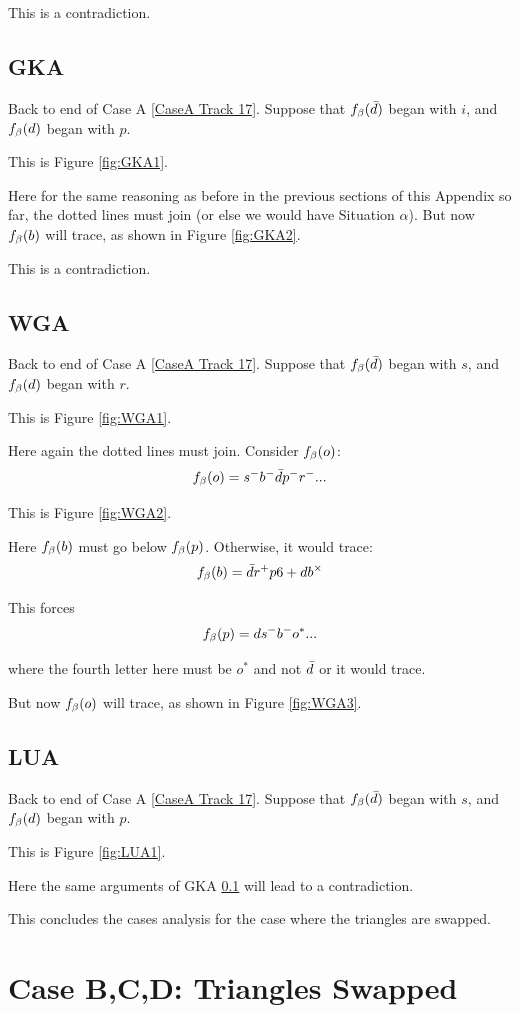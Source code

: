 This is a contradiction.

\subsection{GKA}\label{GKA}
Back to end of Case A \ref{CaseA Track 17}. Suppose that $f_\beta(\bar{d})$ began with $i$, and $f_\beta(d)$ began with $p$.

This is Figure \ref{fig:GKA1}.

Here for the same reasoning as before in the previous sections of this Appendix so far, the dotted lines must join (or else we would have Situation $\alpha$). But now $f_\beta(b)$ will trace, as shown in Figure \ref{fig:GKA2}.

This is a contradiction.

\subsection{WGA}\label{WGA}
Back to end of Case A \ref{CaseA Track 17}. Suppose that $f_\beta(\bar{d})$ began with $s$, and $f_\beta(d)$ began with $r$.

This is Figure \ref{fig:WGA1}.

Here again the dotted lines must join. Consider $f_\beta(o)$:
\[
f_\beta(o) = s^- b^- \bar{d} p^- r^-...
\]

This is Figure \ref{fig:WGA2}.

Here $f_\beta(b)$ must go below $f_\beta(p)$. Otherwise, it would trace:
\[
f_\beta(b) = \bar{d} r^+ p6+ d b^\times
\]

This forces
\[
f_\beta(p) = d s^- b^- o^*...
\]

where the fourth letter here must be $o^*$ and not $\bar{d}$ or it would trace.

But now $f_\beta(o)$ will trace, as shown in Figure \ref{fig:WGA3}.


\subsection{LUA}\label{LUA}
Back to end of Case A \ref{CaseA Track 17}. Suppose that $f_\beta(\bar{d})$ began with $s$, and $f_\beta(d)$ began with $p$.

This is Figure \ref{fig:LUA1}.

Here the same arguments of GKA \ref{GKA} will lead to a contradiction.


This concludes the cases analysis for the case where the triangles are swapped.

\section{Case B,C,D: Triangles Swapped}\label{CaseBCD Track 17}

